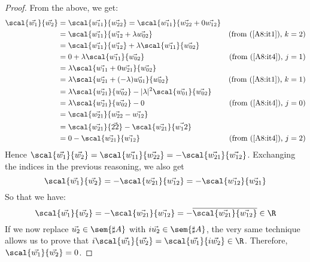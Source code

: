\begin{proof}
    From the above, we get:
    \begin{align*}
        \scal{\vec{w_1}}{\vec{w_2}} &= \scal{\vec{w_{11}}}{\vec{w_{22}}} = \scal{\vec{w_{11}}}{\vec{w_{22}}+0\vec{w_{12}}} & \\
        &=\scal{\vec{w_{11}}}{\vec{w_{12}}+ \lambda\vec{w_{02}}} & (\text{from (\ref{A8:it1}), } k=2)\\
        &=\scal{\vec{w_{11}}}{\vec{w_{12}}} + \lambda \scal{\vec{w_{11}}}{\vec{w_{02}}} &\\
        &= 0 + \lambda \scal{\vec{w_{11}}}{\vec{w_{02}}} & (\text{from (\ref{A8:it4}), } j=1)\\
        &= \lambda \scal{\vec{w_{11}} + 0\vec{w_{21}}}{\vec{w_{02}}} & \\
        &= \lambda \scal{\vec{w_{21}} + (-\lambda)\vec{w_{01}}}{\vec{w_{02}}} & (\text{from (\ref{A8:it1}), } k=1)\\
        &= \lambda \scal{\vec{w_{21}}}{\vec{w_{02}}} - |\lambda|^2 \scal{\vec{w_{01}}}{\vec{w_{02}}} & \\
        &= \lambda \scal{\vec{w_{21}}}{\vec{w_{02}}} - 0 & (\text{from (\ref{A8:it4}), } j=0)\\
        &=\scal{\vec{w_{21}}}{\vec{w_{22}}- \vec{w_{12}}} & \\
        &=\scal{\vec{w_{21}}}{\vec{22}} - \scal{\vec{w_{21}}}{\vec{w_12}} & \\
        &= 0 - \scal{\vec{w_{21}}}{\vec{w_{12}}} & (\text{from (\ref{A8:it4}), } j=2)\\
    \end{align*}
    Hence $\scal{\vec{w_1}}{\vec{w_2}} = \scal{\vec{w_{11}}}{\vec{w_{22}}} = - \scal{\vec{w_{21}}}{\vec{w_{12}}}$. Exchanging the indices in the previous reasoning, we also get 
    \[
    \scal{\vec{w_1}}{\vec{w_2}}=-\scal{\vec{w_{21}}}{\vec{w_{12}}}=-\scal{\vec{w_{12}}}{\vec{w_{21}}}
    \]
    So that we have:
    \[
        \scal{\vec{w_1}}{\vec{w_2}}=-\scal{\vec{w_{21}}}{\vec{w_{12}}}=-\overline{\scal{\vec{w_{21}}}{\vec{w_{12}}}}\in\R
    \]
    If we now replace $\vec{u_2}\in\sem{\sharp A}$ with $i\vec{u_2}\in\sem{\sharp A}$, the very same technique allows us to prove that $i\scal{\vec{w_1}}{\vec{w_2}}=\scal{\vec{w_1}}{i \vec{w_2}}\in\R$. Therefore, $\scal{\vec{w_1}}{\vec{w_2}}=0$.
\end{proof}

